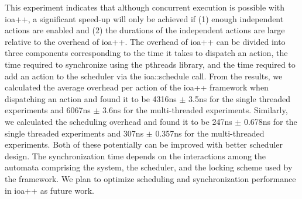 This experiment indicates that although concurrent execution is possible with ioa++, a significant speed-up will only be achieved if (1) enough independent actions are enabled and (2) the durations of the independent actions are large relative to the overhead of ioa++.
The overhead of ioa++ can be divided into three components corresponding to the time it takes to dispatch an action, the time required to synchronize using the pthreads library, and the time required to add an action to the scheduler via the ioa::schedule call.
From the results, we calculated the average overhead per action of the ioa++ framework when dispatching an action and found it to be 4316ns $\pm$ 3.5ns for the single threaded experiments and 6067ns $\pm$ 3.6ns for the multi-threaded experiments.
Similarly, we calculated the scheduling overhead and found it to be 247ns $\pm$ 0.678ns for the single threaded experiments and 307ns $\pm$ 0.357ns for the multi-threaded experiments.
Both of these potentially can be improved with better scheduler design.
The synchronization time depends on the interactions among the automata comprising the system, the scheduler, and the locking scheme used by the framework.
We plan to optimize scheduling and synchronization performance in ioa++ as future work.
